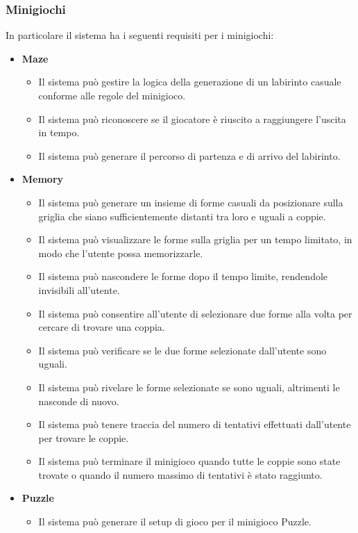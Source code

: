 \subsubsection{Minigiochi} \label{sec:functional-requirements:minigames}
In particolare il sistema ha i seguenti requisiti per i minigiochi:
\begin{itemize}
      \item \textbf{Maze}\par
            \begin{itemize}
                  \item Il sistema può gestire la logica della generazione di un labirinto 
                  casuale conforme alle regole del minigioco.
                  \item Il sistema può riconoscere se il giocatore è riuscito a raggiungere 
                  l'uscita in tempo.
                  \item Il sistema può generare il percorso di partenza e di arrivo del 
                  labirinto. 
            \end{itemize}
      \item \textbf{Memory}\par
            \begin{itemize}
                  \item Il sistema può generare un insieme di forme casuali da posizionare sulla griglia che siano 
                        sufficientemente distanti tra loro e uguali a coppie.
                  \item Il sistema può visualizzare le forme sulla griglia per un tempo limitato, in modo che l'utente
                        possa memorizzarle.
                  \item Il sistema può nascondere le forme dopo il tempo limite, rendendole invisibili all'utente.
                  \item Il sistema può consentire all'utente di selezionare due forme alla volta
                        per cercare di trovare una coppia.
                  \item Il sistema può verificare se le due forme selezionate dall'utente sono uguali.
                  \item Il sistema può rivelare le forme selezionate se sono uguali, altrimenti le nasconde di nuovo.
                  \item Il sistema può tenere traccia del numero di tentativi effettuati dall'utente per trovare le coppie.
                  \item Il sistema può terminare il minigioco quando tutte le coppie sono state trovate o quando il numero massimo di tentativi
                        è stato raggiunto.
            \end{itemize}
      \item \textbf{Puzzle} \par
            \begin{itemize}
                  \item Il sistema può generare il setup di gioco per il minigioco Puzzle.
            \end{itemize}
\end{itemize}